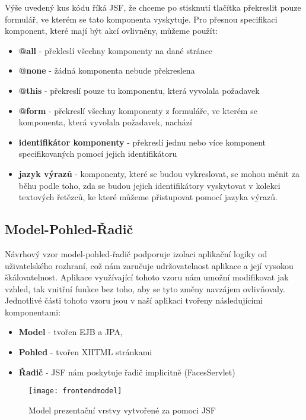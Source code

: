 \documentclass[122pt,oneside]{fithesis}
\begin{document}
Výše uvedený kus kódu říká JSF, že chceme po stisknutí tlačítka překreslit pouze formulář, ve kterém se tato komponenta vyskytuje. Pro přesnou specifikaci komponent, které mají být akcí ovlivněny, můžeme použít:
\begin{itemize}
  \item {\bf @all} - překleslí všechny komponenty na dané stránce 
  \item {\bf @none} - žádná komponenta nebude překreslena
  \item {\bf @this} - překreslí pouze tu komponentu, která vyvolala požadavek
  \item {\bf @form} - překreslí všechny komponenty z formuláře, ve kterém se komponenta, která vyvolala požadavek, nachází
  \item {\bf identifikátor komponenty} - překreslí jednu nebo více komponent specifikovaných pomocí jejich identifikátoru
  \item {\bf jazyk výrazů} - komponenty, které se budou vykreslovat, se mohou měnit za běhu podle toho, zda se budou jejich identifikátory vyskytovat v kolekci textových řetězců, ke které můžeme přistupovat pomocí jazyka výrazů.
\end{itemize}


\subsection{Model-Pohled-Řadič}
Návrhový vzor model-pohled-řadič podporuje izolaci aplikační logiky od uživatelského rozhraní, což nám zaručuje udržovatelnost aplikace a její vysokou škálovatelnost. Aplikace využívající tohoto vzoru nám umožní modifikovat jak vzhled, tak vnitřní funkce bez toho, aby se tyto změny navzájem ovlivňovaly. Jednotlivé části tohoto vzoru jsou v naší aplikaci tvořeny následujícími komponentami:

\begin{itemize}
  \item {\bf Model} - tvořen EJB a JPA,
  \item {\bf Pohled} - tvořen XHTML stránkami
  \item {\bf Řadič} - JSF nám poskytuje řadič implicitně (FacesServlet)
\end{itemize}

\begin{figure}[!ht]
\centering
\texttt{[image: frontendmodel]}
\caption{Model prezentační vrstvy vytvořené za pomoci JSF}
\label{fig:frontend}
\end{figure}
\end{document}

